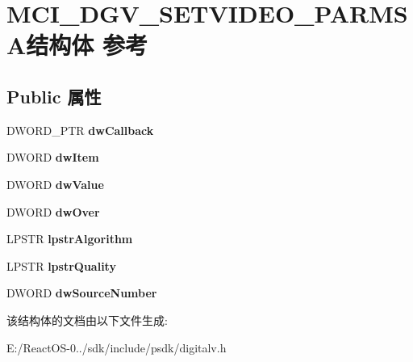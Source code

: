 \hypertarget{struct_m_c_i___d_g_v___s_e_t_v_i_d_e_o___p_a_r_m_s_a}{}\section{M\+C\+I\+\_\+\+D\+G\+V\+\_\+\+S\+E\+T\+V\+I\+D\+E\+O\+\_\+\+P\+A\+R\+M\+S\+A结构体 参考}
\label{struct_m_c_i___d_g_v___s_e_t_v_i_d_e_o___p_a_r_m_s_a}
\subsection*{Public 属性}
\begin{DoxyCompactItemize}
\item 
\mbox{\label{struct_m_c_i___d_g_v___s_e_t_v_i_d_e_o___p_a_r_m_s_a_ad78371a461d7211c68440c6985ba7725}} 
D\+W\+O\+R\+D\+\_\+\+P\+TR {\bfseries dw\+Callback}
\item 
\mbox{\label{struct_m_c_i___d_g_v___s_e_t_v_i_d_e_o___p_a_r_m_s_a_a9aeac1b29a24f2c330a178f7f7ef5383}} 
D\+W\+O\+RD {\bfseries dw\+Item}
\item 
\mbox{\label{struct_m_c_i___d_g_v___s_e_t_v_i_d_e_o___p_a_r_m_s_a_acb1fd6c41f2bef7b86919be9ba3a5845}} 
D\+W\+O\+RD {\bfseries dw\+Value}
\item 
\mbox{\label{struct_m_c_i___d_g_v___s_e_t_v_i_d_e_o___p_a_r_m_s_a_a330f655910b5f2a45ab0a3adc6b6353f}} 
D\+W\+O\+RD {\bfseries dw\+Over}
\item 
\mbox{\label{struct_m_c_i___d_g_v___s_e_t_v_i_d_e_o___p_a_r_m_s_a_ab9d8a46bf2a2a3b35831927f3a19da2d}} 
L\+P\+S\+TR {\bfseries lpstr\+Algorithm}
\item 
\mbox{\label{struct_m_c_i___d_g_v___s_e_t_v_i_d_e_o___p_a_r_m_s_a_a166ab4be09a894e3dfcf2b30fa838151}} 
L\+P\+S\+TR {\bfseries lpstr\+Quality}
\item 
\mbox{\label{struct_m_c_i___d_g_v___s_e_t_v_i_d_e_o___p_a_r_m_s_a_a5a530098493cd5d16411a160cbd6bf1c}} 
D\+W\+O\+RD {\bfseries dw\+Source\+Number}
\end{DoxyCompactItemize}


该结构体的文档由以下文件生成\+:\begin{DoxyCompactItemize}
\item 
E\+:/\+React\+O\+S-\/0../sdk/include/psdk/digitalv.\+h\end{DoxyCompactItemize}
